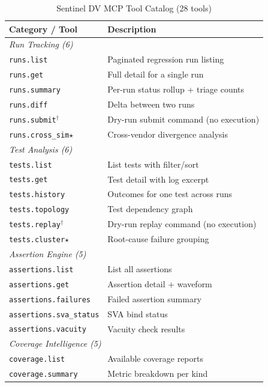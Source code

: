 \documentclass[10pt,twocolumn]{article}
\begin{document}
\begin{table}[h]
\centering
\caption{Sentinel DV MCP Tool Catalog (28 tools)}
\label{tab:tools}
\small
\begin{tabular}{p{2.6cm}p{4.8cm}}
\toprule
\textbf{Category / Tool} & \textbf{Description} \\
\midrule
\multicolumn{2}{l}{\textit{Run Tracking (6)}} \\
\texttt{runs.list}     & Paginated regression run listing \\
\texttt{runs.get}      & Full detail for a single run \\
\texttt{runs.summary} & Per-run status rollup + triage counts \\
\texttt{runs.diff}     & Delta between two runs \\
\texttt{runs.submit}$^\dagger$ & Dry-run submit command (no execution) \\
\texttt{runs.cross\_sim}$\star$ & Cross-vendor divergence analysis \\
\midrule
\multicolumn{2}{l}{\textit{Test Analysis (6)}} \\
\texttt{tests.list}    & List tests with filter/sort \\
\texttt{tests.get}     & Test detail with log excerpt \\
\texttt{tests.history} & Outcomes for one test across runs \\
\texttt{tests.topology}& Test dependency graph \\
\texttt{tests.replay}$^\dagger$  & Dry-run replay command (no execution) \\
\texttt{tests.cluster}$\star$ & Root-cause failure grouping \\
\midrule
\multicolumn{2}{l}{\textit{Assertion Engine (5)}} \\
\texttt{assertions.list}    & List all assertions \\
\texttt{assertions.get}     & Assertion detail + waveform\\
\texttt{assertions.failures}& Failed assertion summary \\
\texttt{assertions.sva\_status}& SVA bind status \\
\texttt{assertions.vacuity} & Vacuity check results \\
\midrule
\multicolumn{2}{l}{\textit{Coverage Intelligence (5)}} \\
\texttt{coverage.list}    & Available coverage reports \\
\texttt{coverage.summary} & Metric breakdown per kind \\

\end{tabular}
\end{table}
\end{document}
